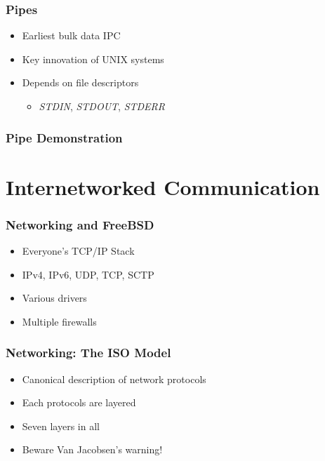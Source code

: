 \documentclass[pdftex]{beamer} %
\begin{document}
\begin{frame}[fragile]
  \frametitle{Pipes}
  \begin{itemize}
  \item Earliest bulk data IPC
  \item Key innovation of UNIX systems
  \item Depends on file descriptors
    \begin{itemize}
    \item \emph{STDIN}, \emph{STDOUT}, \emph{STDERR}
    \end{itemize}
 \end{itemize}
\end{frame}

\begin{frame}
  \frametitle{Pipe Demonstration}
\end{frame}

\section{Internetworked Communication}
\label{sec:internet}

\begin{frame}
  \frametitle{Networking and FreeBSD}
  \begin{itemize}
  \item Everyone's TCP/IP Stack
  \item IPv4, IPv6, UDP, TCP, SCTP
  \item Various drivers
  \item Multiple firewalls
  \end{itemize}
\end{frame}

\begin{frame}
  \frametitle{Networking: The ISO Model}
  \begin{itemize}
  \item Canonical description of network protocols
  \item Each protocols are layered
  \item Seven layers in all
  \item Beware Van Jacobsen's warning!
  \end{itemize}
\end{frame}
\end{document}
